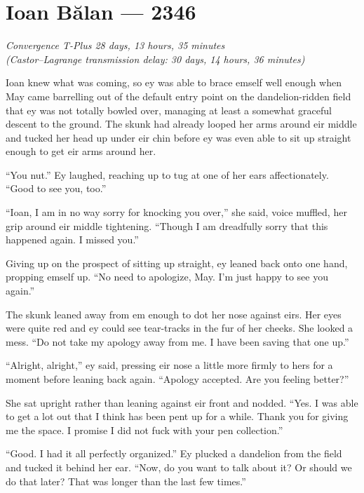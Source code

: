 \hypertarget{ioan-bux103lan-2346}{%
\chapter{Ioan Bălan — 2346}\label{ioan-bux103lan-2346}}

\begin{center}
\emph{Convergence T-Plus 28 days, 13 hours, 35 minutes}\\
\emph{(Castor--Lagrange transmission delay: 30 days, 14 hours, 36 minutes)}
\end{center}

\noindent Ioan knew what was coming, so ey was able to brace emself well enough when May came barrelling out of the default entry point on the dandelion-ridden field that ey was not totally bowled over, managing at least a somewhat graceful descent to the ground. The skunk had already looped her arms around eir middle and tucked her head up under eir chin before ey was even able to sit up straight enough to get eir arms around her.

``You nut.'' Ey laughed, reaching up to tug at one of her ears affectionately. ``Good to see you, too.''

``Ioan, I am in no way sorry for knocking you over,'' she said, voice muffled, her grip around eir middle tightening. ``Though I am dreadfully sorry that this happened again. I missed you.''

Giving up on the prospect of sitting up straight, ey leaned back onto one hand, propping emself up. ``No need to apologize, May. I'm just happy to see you again.''

The skunk leaned away from em enough to dot her nose against eirs. Her eyes were quite red and ey could see tear-tracks in the fur of her cheeks. She looked a mess. ``Do not take my apology away from me. I have been saving that one up.''

``Alright, alright,'' ey said, pressing eir nose a little more firmly to hers for a moment before leaning back again. ``Apology accepted. Are you feeling better?''

She sat upright rather than leaning against eir front and nodded. ``Yes. I was able to get a lot out that I think has been pent up for a while. Thank you for giving me the space. I promise I did not fuck with your pen collection.''

``Good. I had it all perfectly organized.'' Ey plucked a dandelion from the field and tucked it behind her ear. ``Now, do you want to talk about it? Or should we do that later? That was longer than the last few times.''

